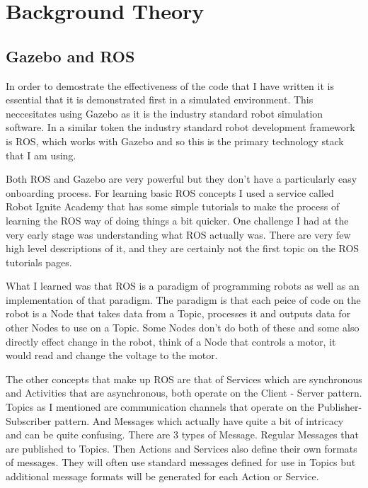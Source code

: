\documentclass[]{../resources/final_report}
\begin{document}
\chapter{Background Theory}

\section{Gazebo and ROS}

In order to demostrate the effectiveness of the code that I have written it is essential that it is 
demonstrated first in a simulated environment. This neccesitates using Gazebo as it is the industry 
standard robot simulation software. In a similar token the industry standard robot development 
framework is ROS, which works with Gazebo and so this is the primary technology stack that I am 
using.

Both ROS and Gazebo are very powerful but they don't have a particularly easy onboarding process. 
For learning basic ROS concepts I used a service called Robot Ignite Academy that has some simple 
tutorials to make the process of learning the ROS way of doing things a bit quicker. One challenge I 
had at the very early stage was understanding what ROS actually was. There are very few high level 
descriptions of it, and they are certainly not the first topic on the ROS tutorials pages.

What I learned was that ROS is a paradigm of programming robots as well as an 
implementation of that paradigm. The paradigm is that each peice of code on the robot is a Node 
that takes data from a Topic, processes it and outputs data for other Nodes to use on a Topic. 
Some Nodes don't do both of these and some also directly effect change in the robot, think of a 
Node that controls a motor, it would read and change the voltage to the motor.

The other concepts that make up ROS are that of Services which are synchronous and Activities that 
are asynchronous, both operate on the Client - Server pattern. Topics as I mentioned are 
communication channels that operate on the Publisher-Subscriber pattern. And Messages which actually 
have quite a bit of intricacy and can be quite confusing. There are 3 types of Message. Regular 
Messages that are published to Topics. Then Actions and Services also define their own formats of 
messages. They will often use standard messages defined for use in Topics but additional message 
formats will be generated for each Action or Service.
\end{document}
